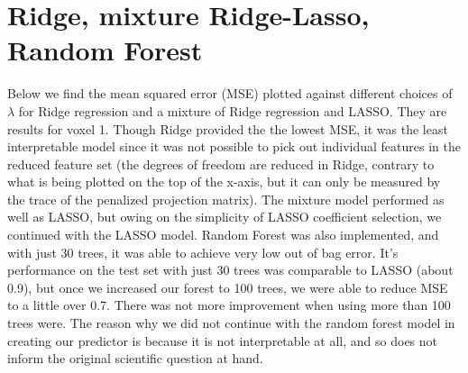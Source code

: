 \documentclass[english]{amsart}
\begin{document}
\section{Ridge, mixture Ridge-Lasso, Random Forest}
Below we find the mean squared error (MSE) plotted against different choices of $\lambda$ for Ridge regression and a mixture of Ridge regression and LASSO. They are results for voxel 1. Though Ridge provided the the lowest MSE, it was the least interpretable model since it was not possible to pick out individual features in the reduced feature set (the degrees of freedom are reduced in Ridge, contrary to what is being plotted on the top of the x-axis, but it can only be measured by the trace of the penalized projection matrix).  The mixture model performed as well as LASSO, but owing on the simplicity of LASSO coefficient selection, we continued with the LASSO model.  Random Forest was also implemented, and with just 30 trees, it was able to achieve very low out of bag error.  It's performance on the test set with just 30 trees was comparable to LASSO (about 0.9), but once we increased our forest to 100 trees, we were able to reduce MSE to a little over 0.7.  There was not more improvement when using more than 100 trees were.  The reason why we did not continue with the random forest model in creating our predictor is because it is not interpretable at all, and so does not inform the original scientific question at hand.  
\end{document}
